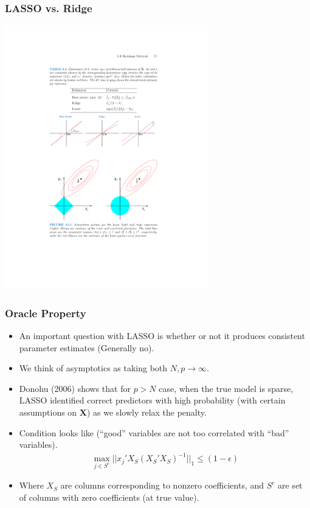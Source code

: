\begin{frame}
\frametitle{LASSO vs. Ridge}
\begin{center}
\includegraphics[width=3.5in]{./resources/orthcompare}
\end{center}
\end{frame}


\begin{frame}
    \frametitle{Oracle Property}
    \begin{itemize}
    \item An important question with LASSO is whether or not it produces consistent parameter estimates (Generally \alert{no}).
    \item We think of asymptotics as taking both $N,p\rightarrow \infty$.
    \item Donohu (2006) shows that for $p > N$ case, when the true model is sparse, LASSO identified correct predictors with high probability (with certain assumptions on $\mathbf{X}$) as we slowly relax the penalty.
    \item Condition looks like (``good'' variables are not too correlated with ``bad'' variables).
    \begin{eqnarray*}
    \max_{j \in S^{c}} || x_j' X_{S} (X_{S}' X_{S})^{-1} ||_{1} \leq (1 -\epsilon) 
    \end{eqnarray*}
    \item Where $X_{S}$ are columns corresponding to nonzero coefficients, and $S^{c}$ are set of columns with zero coefficients (at true value).
    \end{itemize}
\end{frame}


